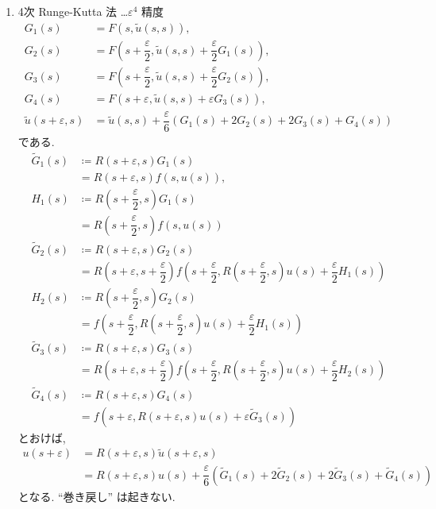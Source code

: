 \documentclass[12pt, a4j]{jsarticle}
\newcommand{\e}{\varepsilon}
\begin{document}
\begin{enumerate}[label=(\arabic{*})]
 \item 4次 Runge-Kutta 法 \dots $\e^{4}$ 精度
       \begin{align}
	G_{1}(s)
	&= F(s, \tilde{u}(s, s)),
	\\
	G_{2}(s)
	&= F\left( 
	      s + \dfrac{\e}{2}, 
	      \tilde{u}(s, s) + \dfrac{\e}{2} G_{1}(s)
	    \right),
	\\
	G_{3}(s)
	&= F\left( 
	      s + \dfrac{\e}{2}, 
	      \tilde{u}(s, s) + \dfrac{\e}{2} G_{2}(s)
	    \right),
	\\
	G_{4}(s)
	&= F(s + \e, \tilde{u}(s, s) + \e G_{3}(s)),
	\\
	\tilde{u}(s + \e, s)
	&= \tilde{u}(s, s)
	+ \dfrac{\e}{6}
	  (G_{1}(s) + 2 G_{2}(s) + 2 G_{3}(s) + G_{4}(s))
       \end{align}
       である.
       \begin{align}
	\tilde{G}_{1}(s)
	&\coloneqq R(s + \e, s) G_{1}(s)
	\\
	&= R(s + \e, s) f(s, u(s)),
	\\
	H_{1}(s)
	&\coloneqq R\left(s + \dfrac{\e}{2}, s \right) G_{1}(s)
	\\
	&= R\left( s + \dfrac{\e}{2}, s \right) f(s, u(s))
	\\
	\tilde{G}_{2}(s)
	&\coloneqq R(s + \e, s) G_{2}(s)
	\\
	&= R\left( s + \e, s + \dfrac{\e}{2} \right)
	   f\left(
	      s + \dfrac{\e}{2},
	      R\left( s + \dfrac{\e}{2}, s \right) u(s)
	      + \dfrac{\e}{2} H_{1}(s)
	    \right)
	\\
	H_{2}(s)
	&\coloneqq R\left( s + \dfrac{\e}{2}, s \right) G_{2}(s)
	\\
	&= f\left(
	      s + \dfrac{\e}{2},
	      R\left( s + \dfrac{\e}{2}, s \right) u(s)
	      + \dfrac{\e}{2} H_{1}(s)
	    \right)
	\\
	\tilde{G}_{3}(s)
	&\coloneqq R(s + \e, s) G_{3}(s)
	\\
	&= R\left( s + \e, s + \dfrac{\e}{2} \right)
	   f\left(
	      s + \dfrac{\e}{2},
	      R\left( s + \dfrac{\e}{2}, s \right) u(s)
	      + \dfrac{\e}{2} H_{2}(s)
	    \right)
	\\
	\tilde{G}_{4}(s)
	&\coloneqq R(s + \e, s) G_{4}(s)
	\\
	&= f\left(
	      s + \e,
	      R(s + \e, s) u(s) + \e \tilde{G}_{3}(s)
	    \right)
       \end{align}
       とおけば,
       \begin{align}
	u(s + \e)
	&= R(s + \e, s) \tilde{u}(s + \e, s)
	\\
	&= R(s + \e, s) u(s)
	+ \dfrac{\e}{6}
	\left(
	\tilde{G}_{1}(s) + 2 \tilde{G}_{2}(s)
	+ 2 \tilde{G}_{3}(s) + \tilde{G}_{4}(s)
	\right)
       \end{align}
       となる. ``巻き戻し'' は起きない.
\end{enumerate}
\end{document}
